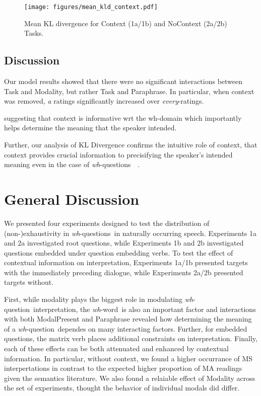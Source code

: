 \documentclass[12pt,letterpaper,table,svgnames,dvipsnames]{article}
\newcommand{\jd}[1]{\textcolor{Purple}{[jd: #1]}}
\newcommand{\whq}{\emph{wh}-question~}
\newcommand{\whqs}{\emph{wh}-questions~}
\newcommand{\whw}{\emph{wh}-word~}
\begin{document}
\begin{figure}[h!]
\centering
\centering
\texttt{[image: figures/mean\_kld\_context.pdf]}
\caption{Mean KL divergence for Context (1a/1b) and NoContext (2a/2b) Tasks.}
\label{density_kld_overall}
\end{figure}


\subsection{Discussion}
Our model results showed that there were no significant interactions between Task and Modality, but rather Task and Paraphrase. In particular, when context was removed, \emph{a} ratings significantly increased over \emph{every}-ratings. 

 suggesting that context is informative wrt the wh-domain which importantly helps determine the meaning that the speaker intended. 


Further, our analysis of KL Divergence confirms the intuitive role of context, that context provides crucial information to precisifying the speaker's intended meaning even in the case of \whqs~.



\section{General Discussion}

We presented four experiments designed to test the distribution of (non-)exhaustivity in \whqs in naturally occurring speech. Experiments 1a and 2a investigated root questions, while Experiments 1b and 2b investigated questions embedded under question embedding verbs. To test the effect of contextual information on interpretation, Experiments 1a/1b presented targets with the immediately preceding dialogue, while Experiments 2a/2b presented targets without.

First, while modality plays the biggest role in modulating \whq interpretation, the \whw is also an important factor and interactions with both ModalPresent and Paraphrase revealed how determining the meaning of a \whq dependes on many interacting factors. Further, for embedded questions, the matrix verb places additional constraints on interpretation. Finally, each of these effects can be both attenuated and enhanced by contextual information. In particular, without context, we found a higher occurrance of MS interpertations in contrast to the expected higher proportion of MA readings given the semantics literature. We also found a relaiable effect of Modality across the set of experiments, thought the behavior of individual modals did differ.
\end{document}
